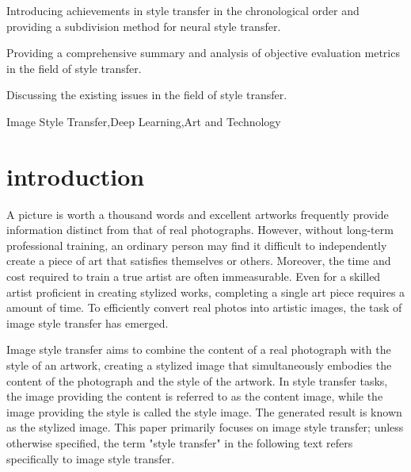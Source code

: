 \documentclass[preprint,12pt]{elsarticle}
\begin{document}
\begin{frontmatter}
\begin{highlights}
\item  Introducing achievements in style transfer in the chronological order and providing a subdivision method for neural style transfer.
\item Providing a comprehensive summary and analysis of objective evaluation metrics in the field of style transfer.
\item Discussing the existing issues in the field of style transfer.
\end{highlights}
\begin{keyword}
Image Style Transfer\sep Deep Learning\sep Art and Technology


\end{keyword}

\end{frontmatter}



% 
\section{introduction}

A picture is worth a thousand words and excellent artworks frequently provide information distinct from that of real photographs. However, without long-term professional training, an ordinary person may find it difficult to independently create a piece of art that satisfies themselves or others. Moreover, the time and cost required to train a true artist are often immeasurable. Even for a skilled artist proficient in creating stylized works, completing a single art piece requires a amount of time. To efficiently convert real photos into artistic images, the task of image style transfer has emerged.

Image style transfer aims to combine the content of a real photograph with the style of an artwork, creating a stylized image that simultaneously embodies the content of the photograph and the style of the artwork. In style transfer tasks, the image providing the content is referred to as the content image, while the image providing the style is called the style image. The generated result is known as the stylized image. This paper primarily focuses on image style transfer; unless otherwise specified, the term "style transfer" in the following text refers specifically to image style transfer.
\end{document}
